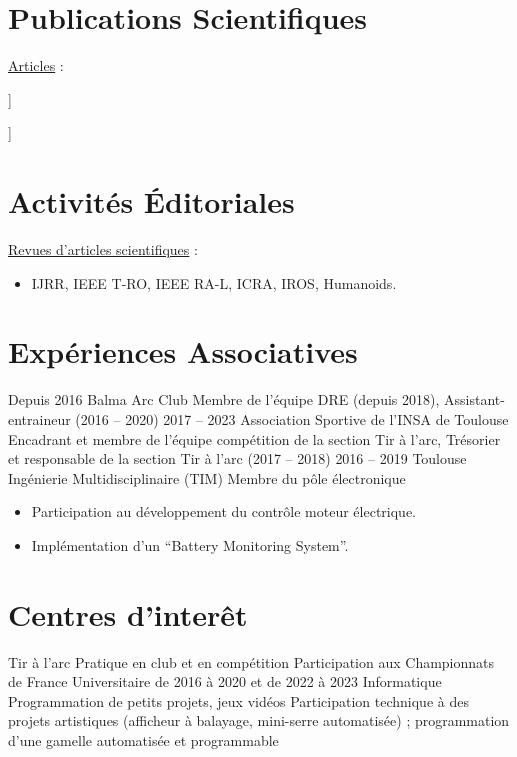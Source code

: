 \documentclass[11pt,a4paper,sans]{moderncv}         %
\newcommand{\items}{\item \hspace{2mm}}
\begin{document}
\section{Publications Scientifiques}
\toggletrue{myrefs}
\large{\underline{Articles} :}
\begin{itemize}%
\normalsize{\item[[1]\hspace{-2mm}]} \normalsize{}
\normalsize{\item[[2]\hspace{-2mm}]} \normalsize{}
\end{itemize}

\newsavebox\mytempbib
\savebox\mytempbib{\parbox{\textwidth}{}}


\section{Activit\'es  \'Editoriales}
\large{\underline{Revues d'articles scientifiques} :}
\begin{itemize}%
\items IJRR, IEEE T-RO, IEEE RA-L, ICRA, IROS, Humanoids.
\end{itemize}

\section{Exp\'eriences Associatives}
\cventry
{Depuis 2016}
{Balma Arc Club}
{Membre de l'\'equipe DRE (depuis 2018), Assistant-entraineur (2016 -- 2020)}
{}
{}
{}
%
\cventry
{2017 -- 2023}
{Association Sportive de l'INSA de Toulouse}
{Encadrant et membre de l'\'equipe comp\'etition de la section Tir \`a l'arc, Tr\'esorier et responsable de la section Tir \`a l'arc (2017 -- 2018)}
{}
{}
{}
%
\cventry
{2016 -- 2019}
{Toulouse Ing\'enierie Multidisciplinaire (TIM)}
{Membre du pôle \'electronique}
{}
{}
{
  \begin{itemize}
    \item Participation au d\'eveloppement du contr\^ole moteur \'electrique.
    \item Impl\'ementation d'un ``Battery Monitoring System''.
  \end{itemize}
}
%

\section{Centres d'inter\^et}

\cventry
{Tir \`a l'arc}
{Pratique en club et en comp\'etition}
{Participation aux Championnats de France Universitaire de 2016 \`a 2020 et de 2022 \`a 2023}
{}
{}
{}
%
\cventry
{Informatique}
{Programmation de petits projets, jeux vid\'eos}
{Participation technique \`a des projets artistiques (afficheur \`a balayage, mini-serre automatis\'ee) ; programmation d'une gamelle automatis\'ee et programmable}
{}
{}
{}
%
\end{document}

